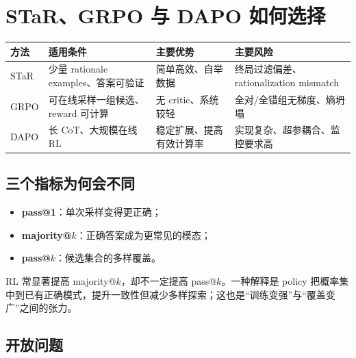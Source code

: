 \section{STaR、GRPO 与 DAPO 如何选择}


\begin{table}[H]
\centering
\small
\begin{tabular}{>{\raggedright\arraybackslash}p{2.2cm}>{\raggedright\arraybackslash}p{3.6cm}>{\raggedright\arraybackslash}p{3.6cm}>{\raggedright\arraybackslash}p{4.0cm}}
\toprule
\textbf{方法} & \textbf{适用条件} & \textbf{主要优势} & \textbf{主要风险} \\
\midrule
STaR & 少量 rationale examples、答案可验证 & 简单高效、自举数据 & 终局过滤偏差、rationalization mismatch \\
GRPO & 可在线采样一组候选、reward 可计算 & 无 critic、系统较轻 & 全对/全错组无梯度、熵坍塌 \\
DAPO & 长 CoT、大规模在线 RL & 稳定扩展、提高有效计算率 & 实现复杂、超参耦合、监控要求高 \\
\bottomrule
\end{tabular}
\end{table}

\subsection{三个指标为何会不同}


\begin{itemize}
    \item \textbf{pass@1}：单次采样变得更正确；
    \item \textbf{majority@$k$}：正确答案成为更常见的模态；
    \item \textbf{pass@$k$}：候选集合的多样覆盖。
\end{itemize}

RL 常显著提高 majority@$k$，却不一定提高 pass@$k$。一种解释是 policy 把概率集中到已有正确模式，提升一致性但减少多样探索；这也是“训练变强”与“覆盖变广”之间的张力。

\subsection{开放问题}

